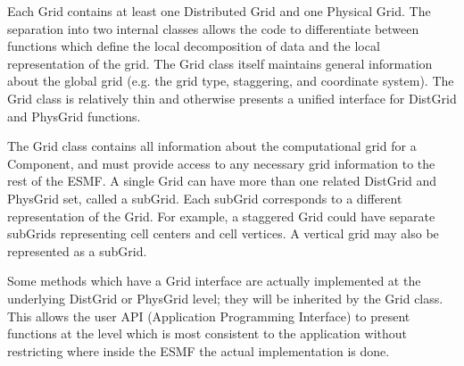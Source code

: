 



Each Grid contains at least one Distributed Grid and one Physical Grid.  
The separation into two internal classes allows the code to differentiate
between functions which define the local decomposition of data and
the local representation of the grid.  The Grid class itself maintains
general information about the global grid (e.g. the grid type, staggering,
and coordinate system).  The Grid class is relatively thin and
otherwise presents a unified interface for DistGrid and PhysGrid
functions.

The Grid class contains all information about the computational grid
for a Component, and must provide access to any necessary grid information
to the rest of the ESMF.  A single Grid can have more than one related
DistGrid and PhysGrid set, called a subGrid.  Each subGrid corresponds to
a different representation of the Grid.  For example, a staggered Grid could
have separate subGrids representing cell centers and cell vertices.  A
vertical grid may also be represented as a subGrid.

Some methods which have a Grid interface are actually implemented
at the underlying DistGrid or PhysGrid level; they will be inherited
by the Grid class.  This allows the user API (Application Programming
Interface) to present functions at the level which is most consistent
to the application without restricting where inside the ESMF the actual
implementation is done.
